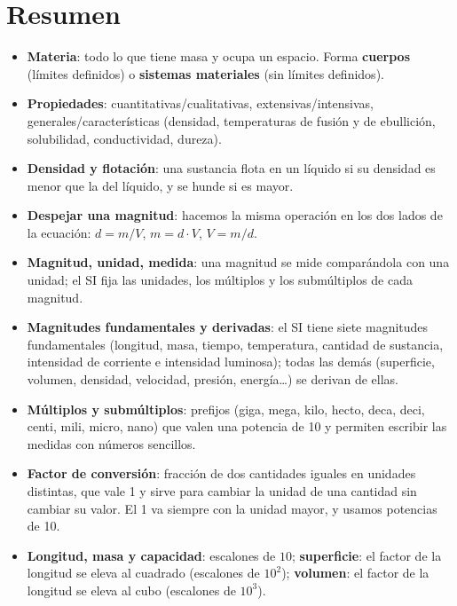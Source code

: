 
\section*{Resumen}

\begin{itemize}
    \item \textbf{Materia}: todo lo que tiene masa y ocupa un espacio. Forma \textbf{cuerpos} (límites definidos) o \textbf{sistemas materiales} (sin límites definidos).
    \item \textbf{Propiedades}: cuantitativas/cualitativas, extensivas/intensivas, generales/características (densidad, temperaturas de fusión y de ebullición, solubilidad, conductividad, dureza).
    \item \textbf{Densidad y flotación}: una sustancia flota en un líquido si su densidad es menor que la del líquido, y se hunde si es mayor.
    \item \textbf{Despejar una magnitud}: hacemos la misma operación en los dos lados de la ecuación: \(d = m/V\), \(m = d \cdot V\), \(V = m/d\).
    \item \textbf{Magnitud, unidad, medida}: una magnitud se mide comparándola con una unidad; el SI fija las unidades, los múltiplos y los submúltiplos de cada magnitud.
    \item \textbf{Magnitudes fundamentales y derivadas}: el SI tiene siete magnitudes fundamentales (longitud, masa, tiempo, temperatura, cantidad de sustancia, intensidad de corriente e intensidad luminosa); todas las demás (superficie, volumen, densidad, velocidad, presión, energía\ldots) se derivan de ellas.
    \item \textbf{Múltiplos y submúltiplos}: prefijos (giga, mega, kilo, hecto, deca, deci, centi, mili, micro, nano) que valen una potencia de 10 y permiten escribir las medidas con números sencillos.
    \item \textbf{Factor de conversión}: fracción de dos cantidades iguales en unidades distintas, que vale 1 y sirve para cambiar la unidad de una cantidad sin cambiar su valor. El 1 va siempre con la unidad mayor, y usamos potencias de 10.
    \item \textbf{Longitud, masa y capacidad}: escalones de \(10\); \textbf{superficie}: el factor de la longitud se eleva al cuadrado (escalones de \(10^{2}\)); \textbf{volumen}: el factor de la longitud se eleva al cubo (escalones de \(10^{3}\)).

\end{itemize}
